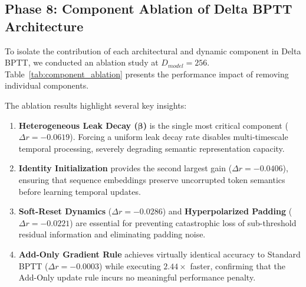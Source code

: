 \documentclass[10pt,a4paper,twoside]{article}
\begin{document}
\subsection{Phase 8: Component Ablation of Delta BPTT Architecture}
To isolate the contribution of each architectural and dynamic component in Delta BPTT, we conducted an ablation study at $D_{model}=256$. Table~\ref{tab:component_ablation} presents the performance impact of removing individual components.

\begin{table}[t!]
\begin{center}
{\caption{Component ablation of the Delta BPTT architecture ($D_{model}=256$).}\label{tab:component_ablation}}


\end{center}
\end{table}

The ablation results highlight several key insights:
\begin{enumerate}
    \item \textbf{Heterogeneous Leak Decay ($\bm{\beta}$)} is the single most critical component ($\Delta r = -0.0619$). Forcing a uniform leak decay rate disables multi-timescale temporal processing, severely degrading semantic representation capacity.
    \item \textbf{Identity Initialization} provides the second largest gain ($\Delta r = -0.0406$), ensuring that sequence embeddings preserve uncorrupted token semantics before learning temporal updates.
    \item \textbf{Soft-Reset Dynamics} ($\Delta r = -0.0286$) and \textbf{Hyperpolarized Padding} ($\Delta r = -0.0221$) are essential for preventing catastrophic loss of sub-threshold residual information and eliminating padding noise.
    \item \textbf{Add-Only Gradient Rule} achieves virtually identical accuracy to Standard BPTT ($\Delta r = -0.0003$) while executing $2.44\times$ faster, confirming that the Add-Only update rule incurs no meaningful performance penalty.
\end{enumerate}
\end{document}
